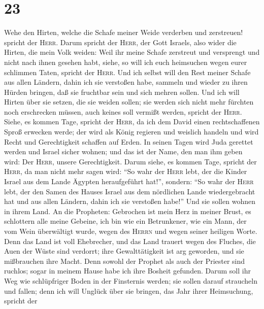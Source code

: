 \hypertarget{section-22}{%
\section{23}\label{section-22}}

 Wehe den Hirten, welche die Schafe meiner Weide verderben
und zerstreuen! spricht der \textsc{Herr}.  Darum spricht
der \textsc{Herr}, der Gott Israels, also wider die Hirten, die mein
Volk weiden: Weil ihr meine Schafe zerstreut und versprengt und nicht
nach ihnen gesehen habt, siehe, so will ich euch heimsuchen wegen eurer
schlimmen Taten, spricht der \textsc{Herr}.  Und ich
selbst will den Rest meiner Schafe aus allen Ländern, dahin ich sie
verstoßen habe, sammeln und wieder zu ihren Hürden bringen, daß sie
fruchtbar sein und sich mehren sollen.  Und ich will
Hirten über sie setzen, die sie weiden sollen; sie werden sich nicht
mehr fürchten noch erschrecken müssen, auch keines soll vermißt werden,
spricht der \textsc{Herr}.  Siehe, es kommen Tage, spricht
der \textsc{Herr}, da ich dem David einen rechtschaffenen Sproß erwecken
werde; der wird als König regieren und weislich handeln und wird Recht
und Gerechtigkeit schaffen auf Erden.  In seinen Tagen
wird Juda gerettet werden und Israel sicher wohnen; und das ist der
Name, den man ihm geben wird: Der \textsc{Herr}, unsere Gerechtigkeit.
 Darum siehe, es kommen Tage, spricht der \textsc{Herr},
da man nicht mehr sagen wird: ``So wahr der \textsc{Herr} lebt, der die
Kinder Israel aus dem Lande Ägypten heraufgeführt hat!'', sondern:
 ``So wahr der \textsc{Herr} lebt, der den Samen des
Hauses Israel aus dem nördlichen Lande wiedergebracht hat und aus allen
Ländern, dahin ich sie verstoßen habe!'' Und sie sollen wohnen in ihrem
Land.  An die Propheten: Gebrochen ist mein Herz in meiner
Brust, es schlottern alle meine Gebeine, ich bin wie ein Betrunkener,
wie ein Mann, der vom Wein überwältigt wurde, wegen des \textsc{Herrn}
und wegen seiner heiligen Worte.  Denn das Land ist voll
Ehebrecher, und das Land trauert wegen des Fluches, die Auen der Wüste
sind verdorrt; ihre Gewalttätigkeit ist arg geworden, und sie
mißbrauchen ihre Macht.  Denn sowohl der Prophet als auch
der Priester sind ruchlos; sogar in meinem Hause habe ich ihre Bosheit
gefunden.  Darum soll ihr Weg wie schlüpfriger Boden in
der Finsternis werden; sie sollen darauf straucheln und fallen; denn ich
will Unglück über sie bringen, das Jahr ihrer Heimsuchung, spricht der
